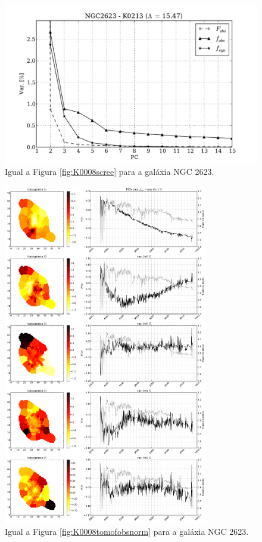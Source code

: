 \begin{figure}
    \includegraphics[height=0.33\textheight]{figuras/K0213-screetest.pdf}
    \caption[Scree test comparativo entre 3 PCAs - NGC 2623.]
    {Igual a Figura \ref{fig:K0008scree} para a galáxia NGC 2623.}
    \label{fig:K0213scree}
\end{figure}

\begin{figure}
    \includegraphics[width=0.8\textwidth]{figuras/K0213-tomo-obs-norm.pdf}
    \caption[Tomogramas de 1 a 5 para o cubo $f_{obs}$ - NGC 2623.]
    {Igual a Figura \ref{fig:K0008tomofobsnorm} para a galáxia NGC 2623.}
    \label{fig:K0213tomofobsnorm}
\end{figure}

